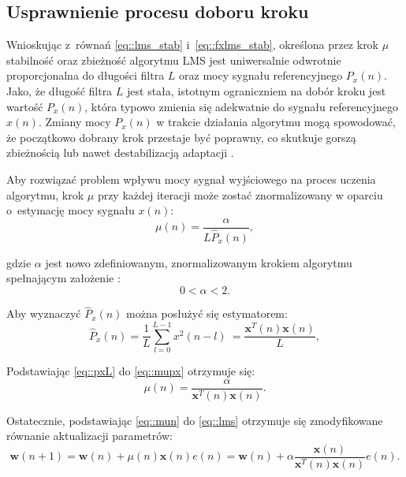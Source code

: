 \subsection{Usprawnienie procesu doboru kroku}

Wnioskując z~równań \ref{eq::lms_stab} i~\ref{eq::fxlms_stab}, określona przez
krok $\mu$ stabilność oraz zbieżność algorytmu LMS jest uniwersalnie odwrotnie
proporcjonalna do długości filtra $L$ oraz mocy sygnału referencyjnego
$P_{x}(n)$. Jako, że długość filtra $L$ jest stała, istotnym ograniczniem na
dobór kroku jest wartość $P_{x}(n)$, która typowo zmienia się adekwatnie do
sygnału referencyjnego $x(n)$. Zmiany mocy $P_{x}(n)$ w trakcie działania
algorytmu mogą spowodować, że początkowo dobrany krok przestaje być poprawny, co
skutkuje gorszą zbieżnością lub nawet destabilizacją adaptacji
\cite{bib:kuo_morgan}. \par Aby rozwiązać problem wpływu mocy sygnał wyjściowego
na proces uczenia algorytmu, krok $\mu$ przy każdej iteracji może zostać
znormalizowany w oparciu o~estymację mocy sygnału $x(n)$:
\begin{equation}
    \mu(n) = \frac{\alpha}{L\hat{P}_x(n)},
    \label{eq::mupx}
\end{equation}

\noindent gdzie $\alpha$ jest nowo zdefiniowanym, znormalizowanym krokiem
algorytmu spełnającym założenie \cite{bib:kuo_morgan}:
\begin{equation}
    0 < \alpha < 2.
\end{equation}

Aby wyznaczyć $\hat{P}_x(n)$ można posłużyć się estymatorem:
\begin{equation}
    \hat{P}_x(n) = \frac{1}{L}\sum_{l = 0}^{L - 1} x^2(n - l) \
        = \frac{\textbf{x}^T(n)\textbf{x}(n)}{L},
    \label{eq::pxL}
\end{equation}

Podstawiając \ref{eq::pxL} do \ref{eq::mupx} otrzymuje się:
\begin{equation}
    \mu(n) = \frac{\alpha}{\textbf{x}^T(n)\textbf{x}(n)}.
    \label{eq::mun}
\end{equation}

Ostatecznie, podstawiając \ref{eq::mun} do \ref{eq::lms} otrzymuje się
zmodyfikowane równanie aktualizacji parametrów:
\begin{equation}
    \textbf{w}(n + 1) = \textbf{w}(n) + \mu(n)\textbf{x}(n)e(n) 
        = \textbf{w}(n) + \alpha\frac{\textbf{x}(n)}{\textbf{x}^T(n)\textbf{x}(n)}e(n).
    \label{eq::nlms}
\end{equation}


